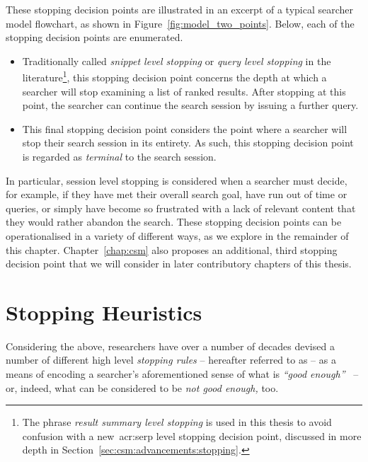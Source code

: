 These stopping decision points are illustrated in an excerpt of a typical searcher model flowchart, as shown in Figure~\ref{fig:model_two_points}. Below, each of the stopping decision points are enumerated.

\vspace*{-4mm}
\begin{itemize}
    \item[\blueboxbold{1}]{ Traditionally called \emph{snippet level stopping} or \emph{query level stopping} in the literature\footnote{The phrase \emph{result summary level stopping} is used in this thesis to avoid confusion with a new~\gls{acr:serp} level stopping decision point, discussed in more depth in Section~\ref{sec:csm:advancements:stopping}.}, this stopping decision point concerns the depth at which a searcher will stop examining a list of ranked results. After stopping at this point, the searcher can continue the search session by issuing a further query.}
    \item[\blueboxbold{2}]{ This final stopping decision point considers the point where a searcher will stop their search session in its entirety. As such, this stopping decision point is regarded as \emph{terminal} to the search session.}
\end{itemize}
\vspace*{-4mm}

In particular, session level stopping is considered when a searcher must decide, for example, if they have met their overall search goal, have run out of time or queries, or simply have become so frustrated with a lack of relevant content that they would rather abandon the search. These stopping decision points can be operationalised in a variety of different ways, as we explore in the remainder of this chapter. Chapter~\ref{chap:csm} also proposes an additional, third stopping decision point that we will consider in later contributory chapters of this thesis.

\section{Stopping Heuristics}\label{sec:stopping_background:heuristics}
Considering the above, researchers have over a number of decades devised a number of different high level \emph{stopping rules} -- hereafter referred to as  -- as a means of encoding a searcher's aforementioned sense of what is \emph{``good enough''}~\citep{zach2005enough_is_enough} -- or, indeed, what can be considered to be \emph{not good enough,} too.

